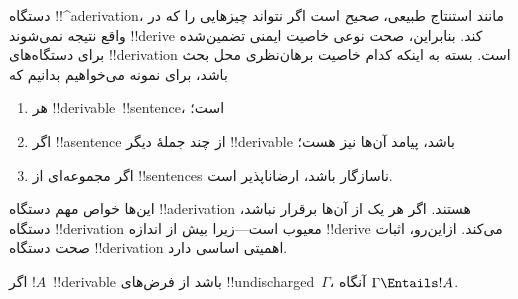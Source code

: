 \documentclass[../../../include/open-logic-section]{subfiles}
\begin{document}
      {}
      {}


\begin{explain}
دستگاه !!^a{derivation}، مانند استنتاج طبیعی، \emph{صحیح} است اگر
نتواند چیزهایی را که در واقع نتیجه نمی‌شوند !!{derive} کند. بنابراین،
صحت نوعی خاصیت ایمنی تضمین‌شده برای دستگاه‌های !!{derivation} است.
بسته به اینکه کدام خاصیت برهان‌نظری محل بحث باشد، برای نمونه می‌خواهیم
بدانیم که
\begin{enumerate}
\item هر !!{derivable}~!!{sentence}،  است؛
\item اگر !!a{sentence} از چند جملهٔ دیگر !!{derivable} باشد، پیامد
  آن‌ها نیز هست؛
\item اگر مجموعه‌ای از !!{sentence}s ناسازگار باشد، ارضاناپذیر است.
\end{enumerate}
این‌ها خواص مهم دستگاه !!a{derivation} هستند. اگر هر یک از آن‌ها برقرار
نباشد، دستگاه !!{derivation} معیوب است---زیرا بیش از اندازه !!{derive}
می‌کند. ازاین‌رو، اثبات صحت دستگاه !!{derivation} اهمیتی اساسی دارد.
\end{explain}

\begin{thm}[صحت]
اگر $!A$~!!{derivable} باشد از فرض‌های !!{undischarged}~$\Gamma$، آنگاه
$\Gamma \Entails !A$.
\end{thm}
\end{document}

